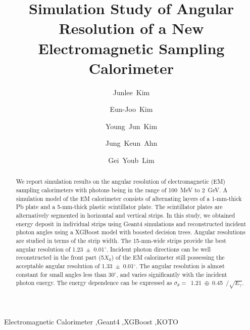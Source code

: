 \documentclass[preprint,12pt,times,a4paper]{elsarticle}
\begin{document}
\begin{frontmatter}

\setcounter{page}{0}
\title{Simulation Study of Angular Resolution of a New Electromagnetic Sampling Calorimeter}

\author[jbnu]{Junlee~Kim}

\author[jbnu]{Eun-Joo~Kim}

\author[korea]{Young~Jun~Kim}
\author[korea]{Jung~Keun~Ahn}
\author[kek]{Gei~Youb~Lim}

\address[jbnu]{Division of Science Education, Jeonbuk National University, Jeonju 54896, Korea}
\address[korea]{Department of Physics, Korea University, Seoul 02841, Korea}
\address[kek]{Institute of Particle and Nuclear Studies (IPNS), High Energy Accelerator Research Organization (KEK), Tsukuba 305-0801, Japan}


\begin{abstract}
We report simulation results on the angular resolution of electromagnetic (EM) sampling calorimeters with photons being in the range of 100~MeV to 2~GeV. A simulation model of the EM calorimeter consists of alternating layers of a 1-mm-thick Pb plate and a 5-mm-thick plastic scintillator plate. The scintillator plates are alternatively segmented in horizontal and vertical strips. In this study, we obtained energy deposit in individual strips using Geant4 simulations and reconstructed incident photon angles using a XGBoost model with boosted decision trees. Angular resolutions are studied in terms of the strip width. The 15-mm-wide strips provide the best angular resolution of 1.23~$\pm$~0.01$^{\circ}$. Incident photon directions can be well reconstructed in the front part (5$X_{0}$) of the EM calorimeter still possessing the acceptable angular resolution of 1.33~$\pm$~0.01$^{\circ}$. The angular resolution is almost constant for small angles less than 30$^{\circ}$, and varies significantly with the incident photon energy. The
energy dependence can be expressed as $\sigma_{\theta}=$~1.21~$\oplus$~0.45~$/\sqrt{E_{\gamma}}$.

\end{abstract}
\begin{keyword}
Electromagnetic Calorimeter \sep Geant4 \sep XGBoost \sep KOTO
\end{keyword}

\end{frontmatter}
\end{document}
